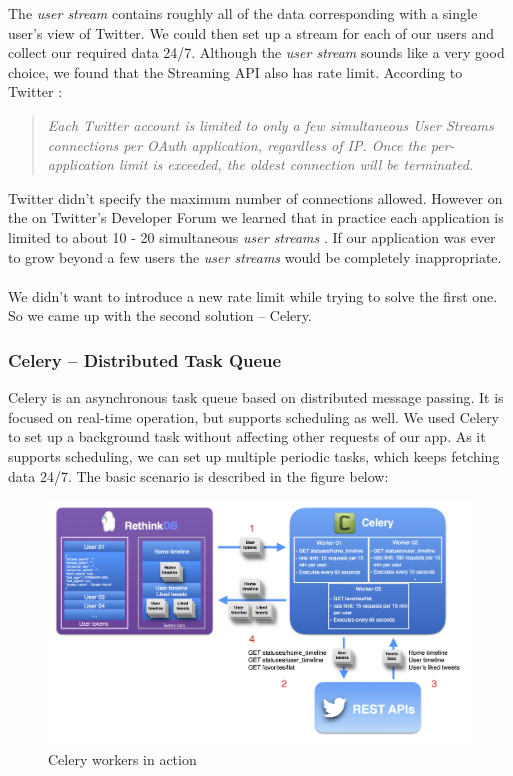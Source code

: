 \documentclass{article}
\begin{document}
The \textit{user stream} contains roughly all of the data corresponding with a single user’s view of Twitter. We could then set up a stream for each of our users and collect our required data 24/7. Although the \textit{user stream} sounds like a very good choice, we found that the Streaming API also has rate limit. According to Twitter \cite{streaming}:

\begin{quote}
    \emph{\small Each Twitter account is limited to only a few simultaneous User Streams connections per OAuth application, regardless of IP. Once the per-application limit is exceeded, the oldest connection will be terminated.}  
\end{quote} 

Twitter didn’t specify the maximum number of connections allowed. However on the on Twitter's Developer Forum we learned that in practice each application is limited to about 10 - 20 simultaneous \textit{user streams} \cite{max}. If our application was ever to grow beyond a few users the \textit{user streams} would be completely inappropriate.
\\\\
We didn't want to introduce a new rate limit while trying to solve the first one. So we came up with the second solution -- Celery.	

\subsubsection*{Celery -- Distributed Task Queue} \label{celery} 
Celery is an asynchronous task queue based on distributed message passing. It is focused on real-time operation, but supports scheduling as well. We used Celery to set up a background task without affecting other requests of our app. As it supports scheduling, we can set up multiple periodic tasks, which keeps fetching data 24/7. The basic scenario is described in the figure below:


\begin{figure}[H]
    \centering
    \includegraphics[width=\textwidth]{celery_scenario} 
    \caption{Celery workers in action}
\end{figure}
\end{document}
